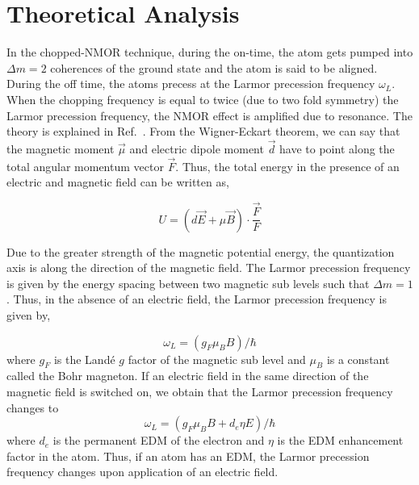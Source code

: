\section{Theoretical Analysis}

In the chopped-NMOR technique, during the on-time, the atom gets pumped into $\Delta m =2$ coherences of the ground state and the atom is said to be aligned. During the off time, the atoms precess at the Larmor precession frequency $\omega_L$. When the chopping frequency is equal to twice (due to two fold symmetry) the Larmor precession frequency, the NMOR effect is amplified due to resonance. The theory is explained in Ref.\ \cite{RCN11}. From the Wigner-Eckart theorem, we can say that the magnetic moment $\vec{\mu}$ and electric dipole moment $\vec{d}$ have to point along the total angular momentum vector $\vec{F}$. Thus, the total energy in the presence of an electric and magnetic field can be written as,

\begin{equation}
U = \left(d\vec{E} + \mu \vec{B}\right) \cdot \frac{\vec{F}}{F}
\end{equation}

Due to the greater strength of the magnetic potential energy, the quantization axis is along the direction of the magnetic field. The Larmor precession frequency is given by the energy spacing between two magnetic sub levels such that $\Delta m =1$. Thus, in the absence of an electric field, the Larmor precession frequency is given by,

\begin{equation}
\omega_L = (g_F \mu_B B)/\hbar
\end{equation}
where $g_F$ is the Land\'e $g$ factor of the magnetic sub level and $\mu_B$ is a constant called the Bohr magneton. If an electric field in the same direction of the magnetic field is switched on, we obtain that the Larmor precession frequency changes to 
\begin{equation}
\omega_L = (g_F \mu_B B + d_e \eta E)/\hbar
\end{equation}
where $d_e$ is the permanent EDM of the electron and $\eta $ is the EDM enhancement factor in the atom. 
Thus, if an atom has an EDM, the Larmor precession frequency changes upon application of an electric field.

